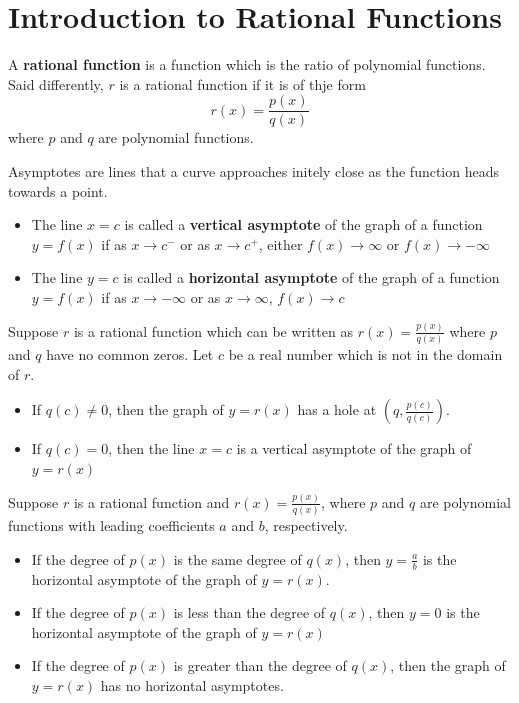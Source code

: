 \section{Introduction to Rational Functions}

\begin{definition}
    A \textbf{rational function} is a function which is the ratio of polynomial functions. Said differently, $r$ is a rational function if it is of thje form
    \[r(x) = \frac{p(x)}{q(x)}\]
    where $p$ and $q$ are polynomial functions.
\end{definition}

\begin{definition}[Asymptote]
    Asymptotes are lines that a curve approaches initely close as the function heads towards a point.
    \begin{itemize}
        \item The line $x=c$ is called a \textbf{vertical asymptote} of the graph of a function $y=f(x)$ if as $x\to c^-$ or as $x\to c^+$, either $f(x) \to \infty$ or $f(x) \to -\infty$
        \item The line $y=c$ is called a \textbf{horizontal asymptote} of the graph of a function $y=f(x)$ if as $x\to -\infty$ or as $x\to \infty $, $f(x) \to c$
    \end{itemize}
\end{definition}

\begin{theorem}
    Suppose $r$ is a rational function which can be written as $r(x) = \frac{p(x)}{q(x)}$ where $p$ and $q$ have no common zeros. Let $c$ be a real number which is not in the domain of $r$.
    \begin{itemize}
        \item If $q(c) \neq 0$, then the graph of $y=r(x)$ has a hole at $(q, \frac{p(c)}{q(c)})$.
        \item If $q(c) = 0$, then the line $x = c$ is a vertical asymptote of the graph of $y = r(x)$
    \end{itemize}
\end{theorem}

\begin{theorem}
    Suppose $r$ is a rational function and $r(x) = \frac{p(x)}{q(x)}$, where $p$ and $q$ are polynomial functions with leading coefficients $a$ and $b$, respectively.
    \begin{itemize}
        \item If the degree of $p(x)$ is the same degree of $q(x)$, then $y=\frac{a}{b}$ is the horizontal asymptote of the graph of $y=r(x)$.
        \item If the degree of $p(x)$ is less than the degree of $q(x)$, then  $y=0$ is the horizontal asymptote of the graph of $y=r(x)$
        \item If the degree of $p(x)$ is greater than the degree of $q(x)$, then the graph of $y=r(x)$ has no horizontal asymptotes.
    \end{itemize}
\end{theorem}

